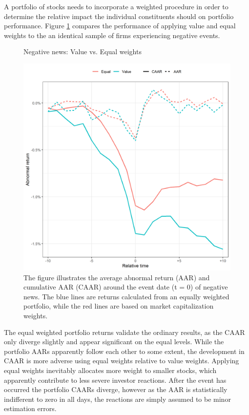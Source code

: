 A portfolio of stocks needs to incorporate a weighted procedure in order to determine the relative impact the individual constituents should on portfolio performance. Figure \ref{fig:ST_neg_sensitivity_weight} compares the performance of applying value and equal weights to the an identical sample of firms experiencing negative events. 

\begin{figure}[H]
    \centering
    \caption{Negative news: Value vs. Equal weights}
    \includegraphics[scale=0.6]{Projekt/1.Figures analysis/ST_negative_sensitivity_weight.png}
     \caption*{\footnotesize The figure illustrates the average abnormal return (AAR) and cumulative AAR (CAAR) around the event date (t = 0) of negative news. The blue lines are returns calculated from an equally weighted portfolio, while the red lines are based on market capitalization weights.}
    \label{fig:ST_neg_sensitivity_weight}
\end{figure} 


The equal weighted portfolio returns validate the ordinary results, as the CAAR only diverge slightly and appear significant on the equal levels. While the portfolio AARs apparently follow each other to some extent, the development in CAAR is more adverse using equal weights relative to value weights. Applying equal weights inevitably allocates more weight to smaller stocks, which apparently contribute to less severe investor reactions. After the event has occurred the portfolio CAARs diverge, however as the AAR is statistically indifferent to zero in all days, the reactions are simply assumed to be minor estimation errors.    


